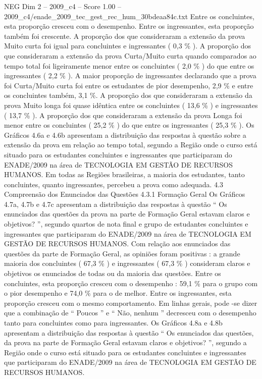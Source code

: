 \begin{textsample}{NEG Dim 2 – 2009\_c4 – Score 1.00 – 2009\_c4/enade\_2009\_tec\_gest\_rec\_hum\_30bdeaa84c.txt}
Entre os concluintes, esta proporção cresceu com o desempenho.
Entre os ingressantes, esta proporção também foi crescente.
A proporção dos que consideraram a extensão da prova Muito curta foi igual para concluintes e ingressantes ( 0,3 \% ).
A proporção dos que consideraram a extensão da prova Curta/Muito curta quando comparados ao tempo total foi ligeiramente menor entre os concluintes ( 2,0 \% ) do que entre os ingressantes ( 2,2 \% ).
A maior proporção de ingressantes declarando que a prova foi Curta/Muito curta foi entre os estudantes de pior desempenho, 2,9 \% e entre os concluintes também, 3,1 \%.
A proporção dos que consideraram a extensão da prova Muito longa foi quase idêntica entre os concluintes ( 13,6 \% ) e ingressantes ( 13,7 \% ).
A proporção dos que consideraram a extensão da prova Longa foi menor entre os concluintes ( 25,2 \% ) do que entre os ingressantes ( 25,3 \% ).
Os Gráficos 4.6a e 4.6b apresentam a distribuição das respostas à questão sobre a extensão da prova em relação ao tempo total, segundo a Região onde o curso está situado para os estudantes concluintes e ingressantes que participaram do ENADE/2009 na área de TECNOLOGIA EM GESTÃO DE RECURSOS HUMANOS.
Em todas as Regiões brasileiras, a maioria dos estudantes, tanto concluintes, quanto ingressantes, percebeu a prova como adequada. 4.3 Compreensão dos Enunciados das Questões 4.3.1 Formação Geral Os Gráficos 4.7a, 4.7b e 4.7c apresentam a distribuição das respostas à questão “ Os enunciados das questões da prova na parte de Formação Geral estavam claros e objetivos? ”, segundo quartos de nota final e grupo de estudantes concluintes e ingressantes que participaram do ENADE/2009 na área de TECNOLOGIA EM GESTÃO DE RECURSOS HUMANOS.
Com relação aos enunciados das questões da parte de Formação Geral, as opiniões foram positivas : a grande maioria dos concluintes ( 67,3 \% ) e ingressantes ( 67,3 \% ) consideram claros e objetivos os enunciados de todas ou da maioria das questões.
Entre os concluintes, esta proporção cresceu com o desempenho : 59,1 \% para o grupo com o pior desempenho e 74,0 \% para o de melhor.
Entre os ingressantes, esta proporção cresceu com o mesmo comportamento.
Em linhas gerais, pode -se dizer que a combinação de “ Poucos ” e “ Não, nenhum ” decresceu com o desempenho tanto para concluintes como para ingressantes.
Os Gráficos 4.8a e 4.8b apresentam a distribuição das respostas à questão “ Os enunciados das questões, da prova na parte de Formação Geral estavam claros e objetivos? ”, segundo a Região onde o curso está situado para os estudantes concluintes e ingressantes que participaram do ENADE/2009 na área de TECNOLOGIA EM GESTÃO DE RECURSOS HUMANOS.

\end{textsample}
